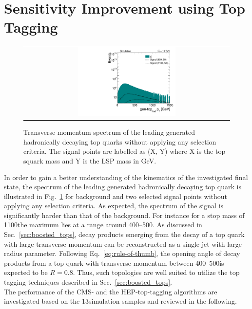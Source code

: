 \section{Sensitivity Improvement using Top Tagging}
\label{sec:stop_btagging}
\begin{figure}[!t]
  \centering
  \begin{tabular}{c}
                \includegraphics[width=0.49\textwidth]{figures/Stop_NoCuts_leading_had_t_ptgen.pdf} 
  \end{tabular}
  \caption{Transverse momentum spectrum of the leading generated hadronically decaying top quarks without applying any selection criteria. The signal points are labelled as (X, Y) where X is the top squark mass and Y is the LSP mass in GeV.}
  \label{fig:stop_gen_top_pt}
\end{figure} 
In order to gain a better understanding of the kinematics of the investigated final state, the \pt spectrum of the leading generated  hadronically decaying top quark is illustrated in Fig.~\ref{fig:stop_gen_top_pt} for \ttbar background and two selected signal points without applying any selection criteria. As expected, the \pt spectrum of the signal is significantly harder than that of the \ttbar background. For instance for a stop mass of 1100\gev the maximum lies at a \pt range around 400--500\gev. As discussed in Sec.~\ref{sec:boosted_tops}, decay products emerging from the decay of a top quark with large transverse momentum can be reconstructed as a single jet with large radius parameter. Following Eq.~\ref{eq:rule-of-thumb}, the opening angle of decay products from a top quark with transverse momentum between 400--500\gev is expected to be $R = 0.8$. Thus, such topologies are well suited to utilize the top tagging techniques described in Sec.~\ref{sec:boosted_tops}. \\
The performance of the CMS- and the HEP-top-tagging algorithms are investigated based on the 13\tev simulation samples and reviewed in the following. 
